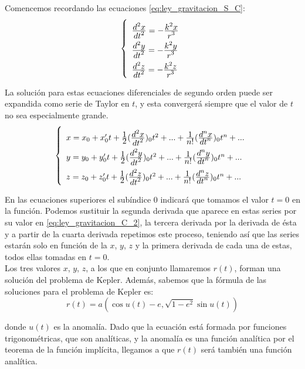 \documentclass[11pt]{book}
\newcommand\ddfrac[2]{\frac{\displaystyle #1}{\displaystyle #2}}
\begin{document}
Comencemos recordando las ecuaciones \eqref{eq:ley_gravitacion_S_C}:
\begin{align}
\left\{
\def\arraystretch{2}
\begin{array}{l}
	\ddfrac{d^2x}{dt^2}=-\ddfrac{k^2x}{r^3}\\
	\ddfrac{d^2y}{dt^2}=-\ddfrac{k^2y}{r^3}\\
	\ddfrac{d^2z}{dt^2}=-\ddfrac{k^2z}{r^3}
\end{array}
\right.
\label{eq:ley_gravitacion_C_2}
\end{align}

La solución para estas ecuaciones diferenciales de segundo orden puede ser expandida como serie de Taylor en $t$, y esta convergerá siempre que el valor de $t$ no sea especialmente grande.
\begin{align}
\left\{
\def\arraystretch{2}
\begin{array}{l}
	x=x_0+x_0't+\ddfrac{1}{2}(\ddfrac{d^2x}{dt^2})_0t^2+...+\ddfrac{1}{n!}(\ddfrac{d^nx}{dt^n})_0t^n+...\\
	y=y_0+y_0't+\ddfrac{1}{2}(\ddfrac{d^2y}{dt^2})_0t^2+...+\ddfrac{1}{n!}(\ddfrac{d^ny}{dt^n})_0t^n+...\\
	z=z_0+z_0't+\ddfrac{1}{2}(\ddfrac{d^2z}{dt^2})_0t^2+...+\ddfrac{1}{n!}(\ddfrac{d^nz}{dt^n})_0t^n+...\\	
\end{array}
\right.
\label{eq:series_taylor}
\end{align}

En las ecuaciones superiores el subíndice 0 indicará que tomamos el valor $t=0$ en la función. Podemos sustituir la segunda derivada que aparece en estas series por su valor en \eqref{eq:ley_gravitacion_C_2}, la tercera derivada por la derivada de ésta y a partir de la cuarta derivada repetimos este proceso, teniendo así que las series estarán solo en función de la $x$, $y$, $z$ y la primera derivada de cada una de estas, todos ellas tomadas en $t=0$.\\

Los tres valores $x$, $y$, $z$, a los que en conjunto llamaremos $r(t)$, forman una solución del problema de Kepler. Además, sabemos que la fórmula de las soluciones para el problema de Kepler es:
\[
r(t)=a(\cos{u(t)}-e,\sqrt{1-e^2}\sin{u(t)})
\]

\noindent donde $u(t)$ es la anomalía. Dado que la ecuación está formada por funciones trigonométricas, que son analíticas, y la anomalía es una función analítica por el teorema de la función implícita, llegamos a que $r(t)$ será también una función analítica.\\
\end{document}
